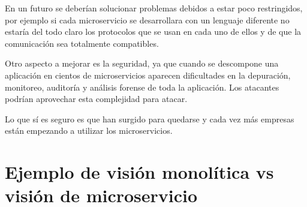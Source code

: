 \documentclass[12pt]{report} %
\begin{document}
En un futuro se deberían solucionar problemas debidos a estar poco restringidos, por ejemplo si cada microservicio se desarrollara con un lenguaje diferente no estaría del todo claro los protocolos que se usan en cada uno de ellos y de que la comunicación sea totalmente compatibles. 

Otro aspecto a mejorar es la seguridad, ya que cuando se descompone una aplicación en cientos de microservicios aparecen dificultades en la depuración, monitoreo, auditoría y análisis forense de toda la aplicación. Los atacantes podrían aprovechar esta complejidad para atacar. 

Lo que sí es seguro es que han surgido para quedarse y cada vez más empresas están empezando a utilizar los microservicios.


\section{Ejemplo de visión monolítica vs visión de microservicio}
\end{document}
